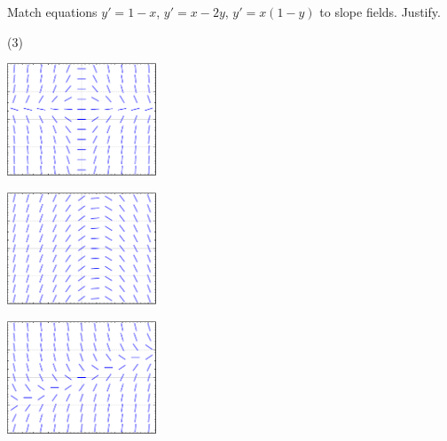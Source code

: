 \begin{exercise}
Match equations $y'=1-x$, $y'=x-2y$, $y' = x(1-y)$ to slope fields.
Justify.
\begin{tasks}(3)
\task
\parbox[c]{1.75in}{\includegraphics[width=1.75in]{figures/yprimex1minusyslope}}
\task
\parbox[c]{1.75in}{\includegraphics[width=1.75in]{figures/yprime1minusxslope}}
\task
\parbox[c]{1.75in}{\includegraphics[width=1.75in]{figures/yprimexminus2yslope}}
\end{tasks}
\end{exercise}



